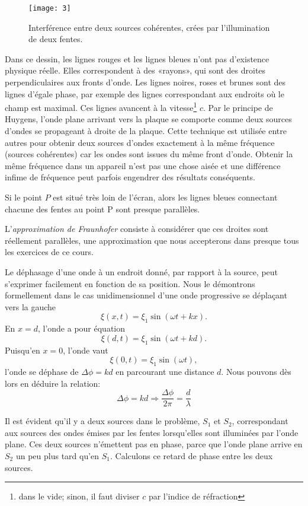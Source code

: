 \begin{figure}[htb]
\centering
\texttt{[image: 3]}
\caption{Interférence entre deux sources cohérentes, crées par l'illumination de deux fentes.}
\label{3}
\end{figure}

Dans ce dessin, les lignes rouges et les lignes bleues n'ont pas d'existence physique réelle. Elles correspondent à des «rayons», qui sont des droites perpendiculaires aux fronts d'onde. Les lignes noires, roses et brunes sont des lignes d'égale phase, par exemple des lignes correspondant aux endroits où le champ est maximal. Ces lignes avancent à la vitesse\footnote{dans le vide; sinon, il faut diviser $c$ par l'indice de réfraction} $c$. Par le principe de Huygens, l'onde plane arrivant vers la plaque se comporte comme deux sources d'ondes se propageant à droite de la plaque. Cette technique est utilisée entre autres pour obtenir deux sources d'ondes exactement à la même fréquence (sources cohérentes) car les ondes sont issues du même front d'onde. Obtenir la même fréquence dans un appareil n'est pas une chose aisée et une différence infime de fréquence peut parfois engendrer des résultats conséquents.

Si le point $P$ est situé très loin de l'écran, alors les lignes bleues connectant chacune des fentes au point P sont presque parallèles. 

L'\textit{approximation de Fraunhofer} consiste à considérer que ces droites sont réellement parallèles, une approximation que nous accepterons dans presque tous les exercices de ce cours.

Le déphasage d'une onde à un endroit donné, par rapport à la source, peut s'exprimer facilement en fonction de sa position. Nous le démontrons formellement dans le cas unidimensionnel d'une onde progressive se déplaçant vers la gauche
$$\xi(x,t)=\xi_1\sin(\omega t+kx).$$
En $x=d$, l'onde a pour équation 
$$ \xi(d,t)=\xi_1\sin(\omega t+kd).$$ 
Puisqu'en $x=0$, l'onde vaut 
$$ \xi(0,t)=\xi_1\sin(\omega t),$$ 
l'onde se déphase de $\Delta \phi=kd$ en parcourant une distance $d$. Nous pouvons dès lors en déduire la relation:
$$\Delta\phi=kd\Rightarrow\frac{\Delta\phi}{2\pi}=\frac{d}{\lambda}$$ 


Il est évident qu'il y a deux sources dans le problème, $S_1$ et $S_2$, correspondant aux sources des ondes émises par les fentes lorsqu'elles sont illuminées par l'onde plane. Ces deux sources n'émettent pas en phase, parce que l'onde plane arrive en $S_2$ un peu plus tard qu'en $S_1$. 
Calculons ce retard de phase entre les deux sources.

